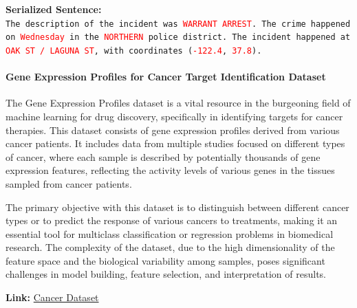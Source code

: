 \documentclass{article}
\theoremstyle{plain}
\theoremstyle{definition}
\theoremstyle{remark}
\begin{document}
\begin{mdframed}
\textbf{Serialized Sentence:}\\
\texttt{The description of the incident was \textcolor{red}{WARRANT ARREST}. The crime happened on \textcolor{red}{Wednesday} in the \textcolor{red}{NORTHERN} police district. The incident happened at \textcolor{red}{OAK ST / LAGUNA ST}, with coordinates (\textcolor{red}{-122.4}, \textcolor{red}{37.8}).\\}
\end{mdframed}

\paragraph{Gene Expression Profiles for Cancer Target Identification Dataset} The Gene Expression Profiles dataset \cite{misc_gene_expression_cancer_rna-seq_401} is a vital resource in the burgeoning field of machine learning for drug discovery, specifically in identifying targets for cancer therapies. This dataset consists of gene expression profiles derived from various cancer patients. It includes data from multiple studies focused on different types of cancer, where each sample is described by potentially thousands of gene expression features, reflecting the activity levels of various genes in the tissues sampled from cancer patients.

The primary objective with this dataset is to distinguish between different cancer types or to predict the response of various cancers to treatments, making it an essential tool for multiclass classification or regression problems in biomedical research. The complexity of the dataset, due to the high dimensionality of the feature space and the biological variability among samples, poses significant challenges in model building, feature selection, and interpretation of results.

\textbf{Link: }\href{https://www.ebi.ac.uk/training/online/courses/machine-learning-drug-discovery/identifying-targets-for-cancer-using-gene-expression-profiles/}{Cancer Dataset}
\end{document}

